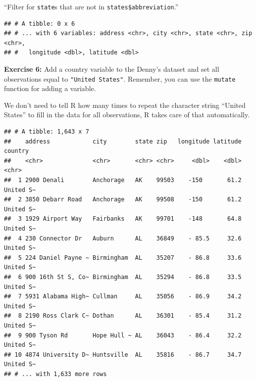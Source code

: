 \documentclass[]{book}
\newenvironment{Shaded}{\begin{snugshade}}{\end{snugshade}}
\newcommand{\KeywordTok}[1]{\textcolor[rgb]{0.13,0.29,0.53}{\textbf{#1}}}
\newcommand{\DataTypeTok}[1]{\textcolor[rgb]{0.13,0.29,0.53}{#1}}
\newcommand{\StringTok}[1]{\textcolor[rgb]{0.31,0.60,0.02}{#1}}
\newcommand{\OperatorTok}[1]{\textcolor[rgb]{0.81,0.36,0.00}{\textbf{#1}}}
\newcommand{\NormalTok}[1]{#1}
\theoremstyle{definition}
\theoremstyle{definition}
\theoremstyle{definition}
\theoremstyle{remark}
\begin{document}
``Filter for \texttt{state}s that are not in
\texttt{states\$abbreviation}.''

\begin{Shaded}
\end{Shaded}

\begin{verbatim}
## # A tibble: 0 x 6
## # ... with 6 variables: address <chr>, city <chr>, state <chr>, zip <chr>,
## #   longitude <dbl>, latitude <dbl>
\end{verbatim}

\textbf{Exercise 6:} Add a country variable to the Denny's dataset and
set all observations equal to \texttt{"United\ States"}. Remember, you
can use the \texttt{mutate} function for adding a variable.

We don't need to tell R how many times to repeat the character string
``United States'' to fill in the data for all observations, R takes care
of that automatically.

\begin{Shaded}
\end{Shaded}

\begin{verbatim}
## # A tibble: 1,643 x 7
##    address            city        state zip   longitude latitude country  
##    <chr>              <chr>       <chr> <chr>     <dbl>    <dbl> <chr>    
##  1 2900 Denali        Anchorage   AK    99503    -150       61.2 United S~
##  2 3850 Debarr Road   Anchorage   AK    99508    -150       61.2 United S~
##  3 1929 Airport Way   Fairbanks   AK    99701    -148       64.8 United S~
##  4 230 Connector Dr   Auburn      AL    36849    - 85.5     32.6 United S~
##  5 224 Daniel Payne ~ Birmingham  AL    35207    - 86.8     33.6 United S~
##  6 900 16th St S, Co~ Birmingham  AL    35294    - 86.8     33.5 United S~
##  7 5931 Alabama High~ Cullman     AL    35056    - 86.9     34.2 United S~
##  8 2190 Ross Clark C~ Dothan      AL    36301    - 85.4     31.2 United S~
##  9 900 Tyson Rd       Hope Hull ~ AL    36043    - 86.4     32.2 United S~
## 10 4874 University D~ Huntsville  AL    35816    - 86.7     34.7 United S~
## # ... with 1,633 more rows
\end{verbatim}
\end{document}

